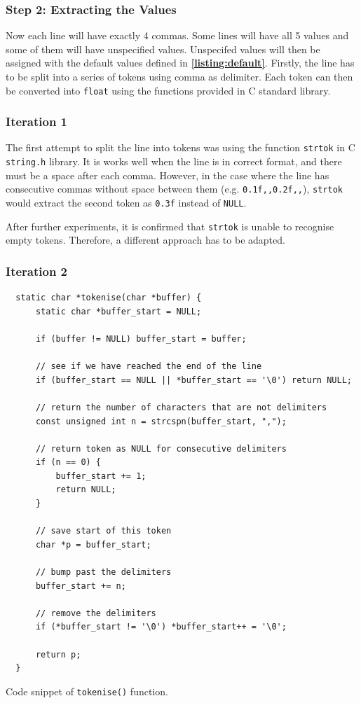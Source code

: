 \documentclass[12pt, a4paper]{article}
\let\oldcref\cref
\renewcommand{\cref}[1]{\textbf{\oldcref{#1}}}
\begin{document}
\subsubsection*{Step 2: Extracting the Values}
Now each line will have exactly 4 commas. Some lines will have all 5 values and some of them will
have unspecified values. Unspecifed values will then be assigned with the default values defined in
\cref{listing:default}. Firstly, the line has to be split into a series of tokens using comma as
delimiter. Each token can then be converted into \texttt{float} using the functions provided
in C standard library.

\subsubsection*{Iteration 1}
The first attempt to split the line into tokens was using the function \texttt{strtok} in C
\texttt{string.h} library. It is works well when the line is in correct format, and there
must be a space after each comma. However, in the case where the line has consecutive commas without
space between them (e.g. \texttt{0.1f,,0.2f,,}), \texttt{strtok} would extract the
second token as \texttt{0.3f} instead of \texttt{NULL}.

After further experiments, it is confirmed that \texttt{strtok} is unable to recognise empty
tokens. Therefore, a different approach has to be adapted.

\subsubsection*{Iteration 2}
\begin{listing}[ht]
  \begin{verbatim}
  static char *tokenise(char *buffer) {
      static char *buffer_start = NULL;

      if (buffer != NULL) buffer_start = buffer;

      // see if we have reached the end of the line
      if (buffer_start == NULL || *buffer_start == '\0') return NULL;

      // return the number of characters that are not delimiters
      const unsigned int n = strcspn(buffer_start, ",");

      // return token as NULL for consecutive delimiters
      if (n == 0) {
          buffer_start += 1;
          return NULL;
      }

      // save start of this token
      char *p = buffer_start;

      // bump past the delimiters
      buffer_start += n;

      // remove the delimiters
      if (*buffer_start != '\0') *buffer_start++ = '\0';

      return p;
  }
  \end{verbatim}
  \caption{Code snippet of \texttt{tokenise()} function.} \label{listing:tokenise}
\end{listing}
\end{document}
